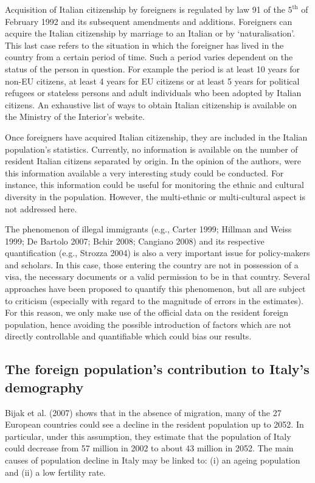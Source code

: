 \documentclass[10pt] {article}
\theoremstyle{definition}
\theoremstyle{plain}
\begin{document}
Acquisition of Italian citizenship by foreigners is regulated by law 91 of the $5^\text{th}$ of February 1992 and its subsequent amendments and additions. Foreigners can acquire the Italian citizenship by marriage to an Italian or by `naturalisation'. This last case refers to the situation in which the foreigner has lived in the country from a certain period of time. Such a period varies dependent on the status of the person in question. For example the period is at least 10 years for non-EU citizens, at least 4 years for EU citizens or at least 5 years for political refugees or stateless persons and adult individuals who been adopted by Italian citizens. An exhaustive list of ways to obtain Italian citizenship is available on the Ministry of the Interior's website.

Once foreigners have acquired Italian citizenship, they are included in the Italian population's statistics. Currently, no information is available on the number of resident Italian citizens separated by origin. In the opinion of the authors, were this information available a very interesting study could be conducted. For instance, this information could be useful for monitoring the ethnic and cultural diversity in the population. However, the multi-ethnic or multi-cultural aspect is not addressed here.

The phenomenon of illegal immigrants (e.g., Carter 1999; Hillman and Weiss 1999; De Bartolo 2007; Bchir 2008; Cangiano 2008) and its respective quantification (e.g., Strozza 2004) is also a very important issue for policy-makers and scholars. In this case, those entering the country are not in possession of a visa, the necessary documents or a valid permission to be in that country. Several approaches have been proposed to quantify this phenomenon, but all are subject to criticism (especially with regard to the magnitude of errors in the estimates). For this reason, we only make use of the official data on the resident foreign population, hence avoiding the possible introduction of factors which are not directly controllable and quantifiable which could bias our results. 


\subsection{The foreign population's contribution to Italy's demography \label{DEM}}

Bijak et al. (2007) shows that in the absence of migration, many of the 27 European countries could see a decline in the resident population up to 2052. In particular, under this assumption, they estimate that the population of Italy could decrease from 57 million in 2002 to about 43 million in 2052. The main causes of population decline in Italy may be linked to: (i) an ageing population and (ii) a low fertility rate. 
\end{document}
